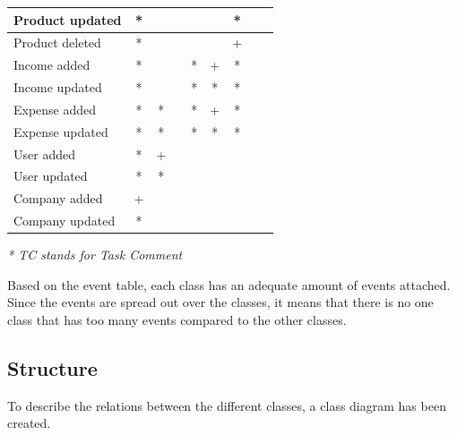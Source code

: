 \begin{tabular}{|l||c|c|c|c|c|c|c|c|}
   Product updated                 &    *    &          &         &          &         &    *    &         &                 \\\hline
   Product deleted                 &    *    &          &         &          &         &    +    &         &                 \\\hline
   Income added                    &    *    &          &         &     *    &    +    &    *    &         &                 \\\hline
   Income updated                  &    *    &          &         &     *    &    *    &    *    &         &                 \\\hline
   Expense added                   &    *    &    *     &         &     *    &    +    &    *    &         &                 \\\hline
   Expense updated                 &    *    &    *     &         &     *    &    *    &    *    &         &                 \\\hline
   User added                  &    *    &    +     &         &          &         &         &         &                 \\\hline
   User updated                &    *    &    *     &         &          &         &         &         &                 \\\hline
   Company added                   &    +    &          &         &          &         &         &         &                 \\\hline
   Company updated                 &    *    &          &         &          &         &         &         &                 \\
  \hline
\end{tabular}
\textit{* TC stands for Task Comment}
                                                                                                                                 
Based on the event table, each class has an adequate amount of events attached. Since the events are spread out over the classes, it means that there is no one class that has too many events compared to the other classes. %

\subsection{Structure}
To describe the relations between the different classes, a class diagram has been created.

